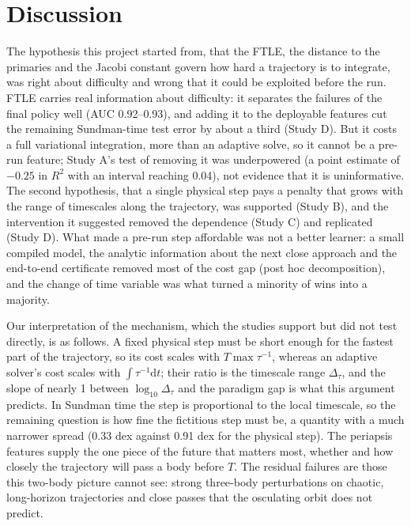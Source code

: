 \documentclass[10pt,letterpaper]{article}
\newcommand{\dd}{\mathrm{d}}
\begin{document}
\section*{Discussion}
The hypothesis this project started from, that the FTLE, the distance to the primaries and the Jacobi constant govern how hard a trajectory is to integrate, was right about difficulty and wrong that it could be exploited before the run. FTLE carries real information about difficulty: it separates the failures of the final policy well (AUC 0.92--0.93), and adding it to the deployable features cut the remaining Sundman-time test error by about a third (Study D). But it costs a full variational integration, more than an adaptive solve, so it cannot be a pre-run feature; Study A's test of removing it was underpowered (a point estimate of $-0.25$ in $R^{2}$ with an interval reaching 0.04), not evidence that it is uninformative. The second hypothesis, that a single physical step pays a penalty that grows with the range of timescales along the trajectory, was supported (Study B), and the intervention it suggested removed the dependence (Study C) and replicated (Study D). What made a pre-run step affordable was not a better learner: a small compiled model, the analytic information about the next close approach and the end-to-end certificate removed most of the cost gap (post hoc decomposition), and the change of time variable was what turned a minority of wins into a majority.

Our interpretation of the mechanism, which the studies support but did not test directly, is as follows. A fixed physical step must be short enough for the fastest part of the trajectory, so its cost scales with $T\max\tau^{-1}$, whereas an adaptive solver's cost scales with $\int\tau^{-1}\dd t$; their ratio is the timescale range $\Delta_{\tau}$, and the slope of nearly 1 between $\log_{10}\Delta_{\tau}$ and the paradigm gap is what this argument predicts. In Sundman time the step is proportional to the local timescale, so the remaining question is how fine the fictitious step must be, a quantity with a much narrower spread (0.33 dex against 0.91 dex for the physical step). The periapsis features supply the one piece of the future that matters most, whether and how closely the trajectory will pass a body before $T$. The residual failures are those this two-body picture cannot see: strong three-body perturbations on chaotic, long-horizon trajectories and close passes that the osculating orbit does not predict.
\end{document}
